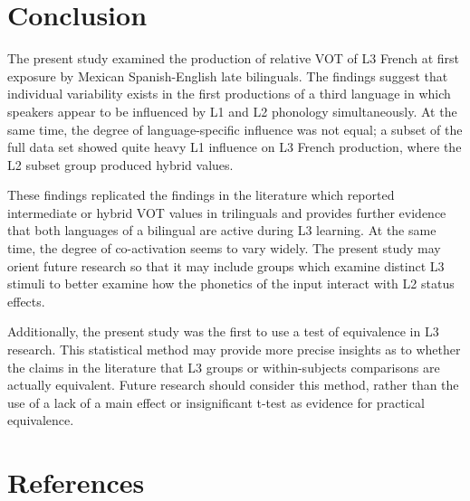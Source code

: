\documentclass[
  english,
  man]{apa6}
\begin{document}
\hypertarget{conclusion}{%
\section{Conclusion}\label{conclusion}}

The present study examined the production of relative VOT of L3 French at first exposure by Mexican Spanish-English late bilinguals.
The findings suggest that individual variability exists in the first productions of a third language in which speakers appear to be influenced by L1 and L2 phonology simultaneously.
At the same time, the degree of language-specific influence was not equal; a subset of the full data set showed quite heavy L1 influence on L3 French production, where the L2 subset group produced hybrid values.

These findings replicated the findings in the literature which reported intermediate or hybrid VOT values in trilinguals and provides further evidence that both languages of a bilingual are active during L3 learning.
At the same time, the degree of co-activation seems to vary widely. The present study may orient future research so that it may include groups which examine distinct L3 stimuli to better examine how the phonetics of the input interact with L2 status effects.

Additionally, the present study was the first to use a test of equivalence in L3 research.
This statistical method may provide more precise insights as to whether the claims in the literature that L3 groups or within-subjects comparisons are actually equivalent.
Future research should consider this method, rather than the use of a lack of a main effect or insignificant t-test as evidence for practical equivalence.

\newpage

\hypertarget{references}{%
\section{References}\label{references}}

\begingroup
\setlength{\parindent}{-0.5in}
\setlength{\leftskip}{0.5in}
\end{document}
